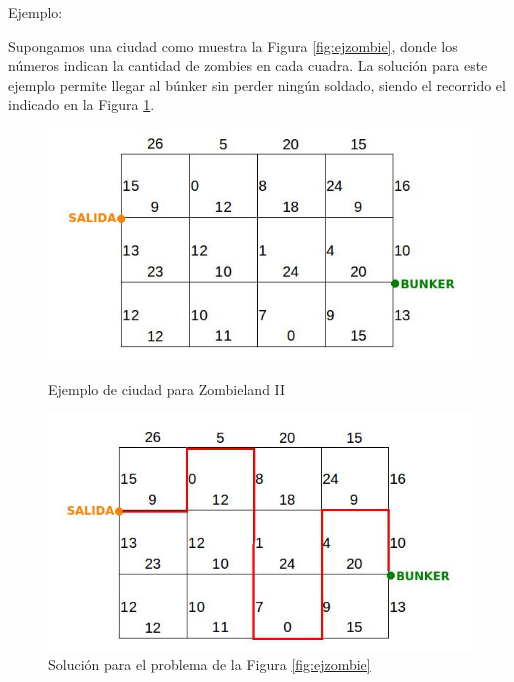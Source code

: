 Ejemplo: 

Supongamos una ciudad como muestra la Figura \ref{fig:ejzombie}, donde los números indican la cantidad de zombies en cada cuadra.
%
%
La solución para este ejemplo permite llegar al búnker sin perder ningún soldado, siendo el recorrido el indicado en la Figura \ref{fig:ejzombieres}.
%

\begin{figure}[!htb]
  \includegraphics[scale=0.5]{imagenes/ejemplozombie.jpeg}
  \caption{Ejemplo de ciudad para Zombieland II}\label{fig:ejzombie}
\endminipage%
  \includegraphics[scale=0.5]{imagenes/ejemplozombieres.jpeg}
  \caption{Solución para el problema de la Figura \ref{fig:ejzombie}}\label{fig:ejzombieres}
\endminipage
\end{figure}


